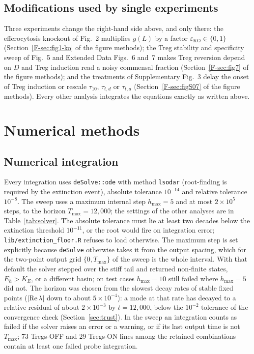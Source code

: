 \documentclass[11pt]{article}
\begin{document}
\subsection{Modifications used by single experiments}
\label{sec:model-mods}

Three experiments change the right-hand side above, and only there: the efferocytosis
knockout of Fig.~2 multiplies $g(L)$ by a factor $\varepsilon_{\mathrm{KO}} \in \{0, 1\}$
(Section~\ref{F-sec:fig1-ko} of the figure methods); the Treg stability and specificity sweep of Fig.~5 and
Extended Data Figs.~6 and~7 makes Treg reversion depend on $D$ and Treg induction read a noisy
commensal fraction (Section~\ref{F-sec:fig7} of the figure methods); and the treatments of Supplementary Fig.~3 delay the onset of Treg induction or rescale $\tau_{10}$, $\tau_{t,d}$
or $\tau_{t,a}$ (Section~\ref{F-sec:figS07} of the figure methods). Every other analysis integrates the
equations exactly as written above.

\section{Numerical methods}
\label{sec:numerics}

\subsection{Numerical integration}
\label{sec:solver}

Every integration uses \texttt{deSolve::ode} with method \texttt{lsodar} (root-finding
is required by the extinction event), absolute tolerance $10^{-14}$ and relative tolerance
$10^{-8}$. The sweep uses a maximum internal step $h_{\max} = 5$ and at most $2\times10^{5}$
steps, to the horizon $T_{\max} = 12{,}000$; the settings of the other analyses are in
Table~\ref{tab:solver}. The absolute tolerance must lie at least two decades
below the extinction threshold $10^{-11}$, or the root would fire on integration error;
\texttt{lib/extinction\_floor.R} refuses to load otherwise. The maximum step is set
explicitly because \texttt{deSolve} otherwise takes it from the output spacing, which
for the two-point output grid $\{0, T_{\max}\}$ of the sweep is the whole interval.
With that default the solver stepped over the stiff tail and returned non-finite
states, $E_h > K_E$, or a different basin; on test cases $h_{\max} = 10$ still failed
where $h_{\max} = 5$ did not. The horizon was chosen from the slowest decay rates of
stable fixed points ($|\mathrm{Re}\,\lambda|$ down to about $5\times10^{-4}$): a mode
at that rate has decayed to a relative residual of about $2\times10^{-3}$ by
$t = 12{,}000$, below the $10^{-2}$ tolerance of the convergence check
(Section~\ref{sec:trust}). In the sweep an integration counts as failed if the solver
raises an error or a warning, or if its last output time is not $T_{\max}$; 73 Tregs-OFF
and 29 Tregs-ON lines among the retained combinations contain at least one failed probe
integration.
\end{document}
